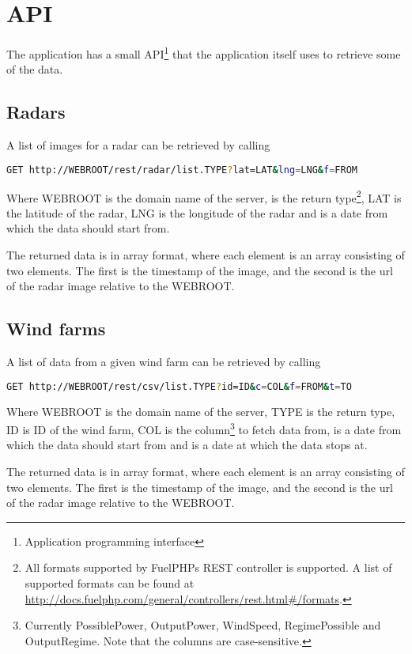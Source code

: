 \section{API}
The application has a small API\footnote{Application programming interface} that the application itself uses to retrieve some of the data.

\subsection{Radars}
A list of images for a radar can be retrieved by calling
\begin{lstlisting}[language=sh,caption={Url for retrieving images for a radar}]
GET http://WEBROOT/rest/radar/list.TYPE?lat=LAT&lng=LNG&f=FROM
\end{lstlisting}
Where \textsf{WEBROOT} is the domain name of the server,  is the return type\footnote{All formats supported by FuelPHPs REST controller is supported. A list of supported formats can be found at \url{http://docs.fuelphp.com/general/controllers/rest.html\#/formats}.\label{fn:fuel_rest}}, \textsf{LAT} is the latitude of the radar, \textsf{LNG} is the longitude of the radar and  is a date from which the data should start from.

The returned data is in array format, where each element is an array consisting of two elements. The first is the timestamp of the image, and the second is the url of the radar image relative to the \textsf{WEBROOT}.

\subsection{Wind farms}
A list of data from a given wind farm can be retrieved by calling
\begin{lstlisting}[language=sh,caption={Url for retrieving data for a wind farm}]
GET http://WEBROOT/rest/csv/list.TYPE?id=ID&c=COL&f=FROM&t=TO
\end{lstlisting}
Where \textsf{WEBROOT} is the domain name of the server, \textsf{TYPE} is the return type, \textsf{ID} is ID of the wind farm, \textsf{COL} is the column\footnote{Currently \textsf{PossiblePower}, \textsf{OutputPower}, \textsf{WindSpeed}, \textsf{RegimePossible} and \textsf{OutputRegime}. Note that the columns are case-sensitive.} to fetch data from,  is a date from which the data should start from and  is a date at which the data stops at.

The returned data is in array format, where each element is an array consisting of two elements. The first is the timestamp of the image, and the second is the url of the radar image relative to the \textsf{WEBROOT}.

